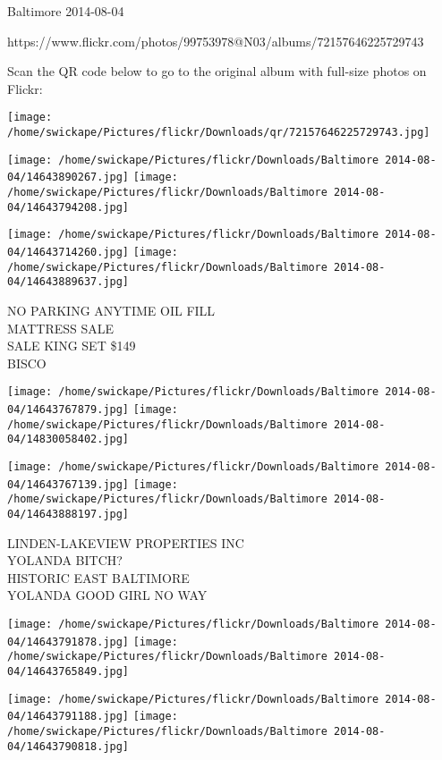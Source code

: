 \documentclass[10pt,letterpaper]{article}
\begin{document}
Baltimore 2014-08-04

https://www.flickr.com/photos/99753978@N03/albums/72157646225729743

Scan the QR code below to go to the original album with full-size photos on Flickr:

\texttt{[image: /home/swickape/Pictures/flickr/Downloads/qr/72157646225729743.jpg]}
\pagebreak

\texttt{[image: /home/swickape/Pictures/flickr/Downloads/Baltimore 2014-08-04/14643890267.jpg]}
\texttt{[image: /home/swickape/Pictures/flickr/Downloads/Baltimore 2014-08-04/14643794208.jpg]}

\texttt{[image: /home/swickape/Pictures/flickr/Downloads/Baltimore 2014-08-04/14643714260.jpg]}
\texttt{[image: /home/swickape/Pictures/flickr/Downloads/Baltimore 2014-08-04/14643889637.jpg]}

NO PARKING ANYTIME OIL FILL\\
MATTRESS SALE\\
SALE KING SET \$149\\
BISCO\\
\pagebreak

\texttt{[image: /home/swickape/Pictures/flickr/Downloads/Baltimore 2014-08-04/14643767879.jpg]}
\texttt{[image: /home/swickape/Pictures/flickr/Downloads/Baltimore 2014-08-04/14830058402.jpg]}

\texttt{[image: /home/swickape/Pictures/flickr/Downloads/Baltimore 2014-08-04/14643767139.jpg]}
\texttt{[image: /home/swickape/Pictures/flickr/Downloads/Baltimore 2014-08-04/14643888197.jpg]}

LINDEN{-}LAKEVIEW PROPERTIES INC\\
YOLANDA BITCH?\\
HISTORIC EAST BALTIMORE\\
YOLANDA GOOD GIRL NO WAY\\
\pagebreak

\texttt{[image: /home/swickape/Pictures/flickr/Downloads/Baltimore 2014-08-04/14643791878.jpg]}
\texttt{[image: /home/swickape/Pictures/flickr/Downloads/Baltimore 2014-08-04/14643765849.jpg]}

\texttt{[image: /home/swickape/Pictures/flickr/Downloads/Baltimore 2014-08-04/14643791188.jpg]}
\texttt{[image: /home/swickape/Pictures/flickr/Downloads/Baltimore 2014-08-04/14643790818.jpg]}
\end{document}
